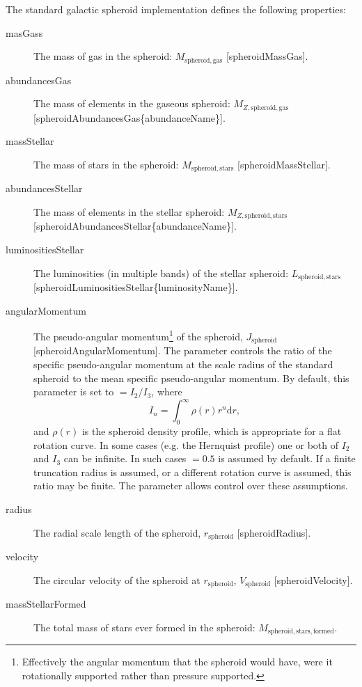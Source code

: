 The standard galactic spheroid implementation defines the following properties:
\begin{description}
 \item [{\normalfont \ttfamily masGass}] The mass of gas in the spheroid: $M_\mathrm{spheroid, gas}$ [{\normalfont \ttfamily spheroidMassGas}].
 \item [{\normalfont \ttfamily abundancesGas}] The mass of elements in the gaseous spheroid: $M_{Z, \mathrm{spheroid, gas}}$ [{\normalfont \ttfamily spheroidAbundancesGas\{abundanceName\}}].
 \item [{\normalfont \ttfamily massStellar}] The mass of stars in the spheroid: $M_\mathrm{spheroid, stars}$ [{\normalfont \ttfamily spheroidMassStellar}].
 \item [{\normalfont \ttfamily abundancesStellar}] The mass of elements in the stellar spheroid: $M_{Z, \mathrm{spheroid, stars}}$ [{\normalfont \ttfamily spheroidAbundancesStellar\{abundanceName\}}].
 \item [{\normalfont \ttfamily luminositiesStellar}] The luminosities (in multiple bands) of the stellar spheroid: $L_\mathrm{spheroid, stars}$ [{\normalfont \ttfamily spheroidLuminositiesStellar\{luminosityName\}}].
 \item [{\normalfont \ttfamily angularMomentum}] The pseudo-angular momentum\footnote{Effectively the angular momentum that the spheroid would have, were it rotationally supported rather than pressure supported.} of the spheroid, $J_\mathrm{spheroid}$ [{\normalfont \ttfamily spheroidAngularMomentum}]. The parameter {\normalfont \ttfamily [spheroidAngularMomentumAtScaleRadius]} controls the ratio of the specific pseudo-angular momentum at the scale radius of the standard spheroid to the mean specific pseudo-angular momentum. By default, this parameter is set to {\normalfont \ttfamily [spheroidAngularMomentumAtScaleRadius]} $= I_2/I_3$, where
\begin{equation}
I_n = \int_0^\infty \rho(r) r^n \mathrm{d}r,
\end{equation}
and $\rho(r)$ is the spheroid density profile, which is appropriate for a flat rotation curve. In some cases (e.g. the Hernquist profile) one or both of $I_2$ and $I_3$ can be infinite. In such cases {\normalfont \ttfamily [spheroidAngularMomentumAtScaleRadius]} $=0.5$ is assumed by default. If a finite truncation radius is assumed, or a different rotation curve is assumed, this ratio may be finite. The {\normalfont \ttfamily [spheroidAngularMomentumAtScaleRadius]} parameter allows control over these assumptions.
 \item [{\normalfont \ttfamily radius}] The radial scale length of the spheroid, $r_\mathrm{spheroid}$ [{\normalfont \ttfamily spheroidRadius}].
 \item [{\normalfont \ttfamily velocity}] The circular velocity of the spheroid at $r_\mathrm{spheroid}$, $V_\mathrm{spheroid}$ [{\normalfont \ttfamily spheroidVelocity}].
 \item [{\normalfont \ttfamily massStellarFormed}] The total mass of stars ever formed in the spheroid: $M_\mathrm{spheroid, stars, formed}$.
\end{description}

